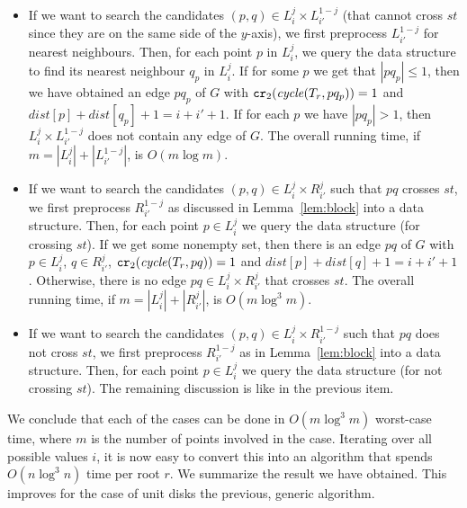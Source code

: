 \documentclass[a4paper,11pt]{article}
\def\dist{\mathit{dist}}
\newcommand{\cycle}{\mathit{cycle}}
\newcommand\CR{\mbox{\tt cr}_2}		  %
\let\le\leqslant
\begin{document}
\begin{itemize}
\item If we want to search the candidates $(p,q)\in L_i^j\times L_{i'}^{1-j}$
	(that cannot cross $st$ since they are on the same side
	of the $y$-axis), we first preprocess $L_{i'}^{1-j}$ for nearest neighbours.
	Then, for each point $p$ in $L_i^j$, we query the data structure
	to find its nearest neighbour $q_p$ in $L_i^j$.
	If for some $p$ we get that $|pq_p|\le 1$, then we have
	obtained an edge $pq_p$ of $G$ with $\CR(\cycle(T_r,pq_p))=1$
	and $\dist[p]+\dist[q_p]+1=i+i'+1$.
	If for each $p$ we have $|pq_p|> 1$, then $L_i^j\times L_{i'}^{1-j}$
	does not contain any edge of $G$.
	The overall running time, if $m=|L_i^j|+|L_{i'}^{1-j}|$, is
	$O(m\log m)$.
\item If we want to search the candidates $(p,q)\in L_i^j\times R_{i'}^{j}$
	such that $pq$ crosses $st$,
	we first preprocess $R_{i'}^{1-j}$ as discussed in Lemma~\ref{lem:block}
	into a data structure.
	Then, for each point $p\in L_i^j$ we query the data structure (for crossing $st$).
	If we get some nonempty set, then there is 
	an edge $pq$ of $G$ with $p\in L_i^j$, $q\in R_{i'}^{j}$, $\CR(\cycle(T_r,pq))=1$
	and $\dist[p]+\dist[q]+1=i+i'+1$.
	Otherwise, there is no edge $pq\in L_i^j\times R_{i'}^{j}$ that crosses $st$.
	The overall running time, if $m=|L_i^j|+|R_{i'}^{j}|$, is
	$O(m\log^3 m)$.
\item If we want to search the candidates $(p,q)\in L_i^j\times R_{i'}^{1-j}$
	such that $pq$ does not cross $st$,
	we first preprocess $R_{i'}^{1-j}$ as in Lemma~\ref{lem:block}
	into a data structure.
	Then, for each point $p\in L_i^j$ we query the data structure (for not crossing $st$).
	The remaining discussion is like in the previous item.
\end{itemize}
We conclude that each of the cases can be done in $O(m\log^3 m)$ worst-case time, where
$m$ is the number of points involved in the case.
Iterating over all possible values $i$, 
it is now easy to convert this into an algorithm that spends $O(n\log^3 n)$ time
per root $r$. We summarize the result we have obtained. This improves for the
case of unit disks the previous, generic algorithm.
\end{document}
